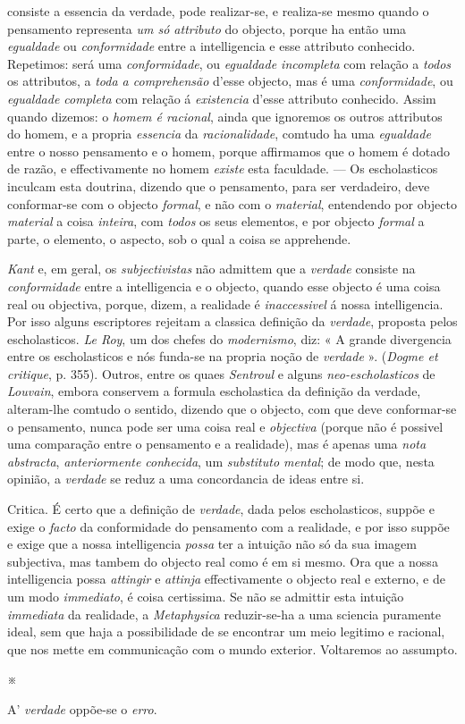 consiste a essencia da verdade, pode realizar-se, e realiza-se mesmo quando o pensamento representa \emph{um só attributo} do objecto, porque ha então uma \emph{egualdade} ou \emph{conformidade} entre a intelligencia e esse attributo conhecido. Repetimos: será uma \emph{conformidade}, ou \emph{egualdade incompleta} com relação a \emph{todos} os attributos, a \emph{toda a comprehensão} d'esse objecto, mas é uma \emph{conformidade}, ou \emph{egualdade completa} com relação á \emph{existencia} d'esse attributo conhecido. Assim quando dizemos: o \emph{homem é racional}, ainda que ignoremos os outros attributos do homem, e a propria \emph{essencia} da \emph{racionalidade}, comtudo ha uma \emph{egualdade} entre o nosso pensamento e o homem, porque affirmamos que o homem é dotado de razão, e effectivamente no homem \emph{existe} esta faculdade. --- Os escholasticos inculcam esta doutrina, dizendo que o pensamento, para ser verdadeiro, deve conformar-se com o objecto \emph{formal}, e não com o \emph{material}, entendendo por objecto \emph{material} a coisa \emph{inteira}, com \emph{todos} os seus elementos, e por objecto \emph{formal} a parte, o elemento, o aspecto, sob o qual a coisa se apprehende.\par \emph{Kant} e, em geral, os \emph{subjectivistas} não admittem que a \emph{verdade} consiste na \emph{conformidade} entre a intelligencia e o objecto, quando esse objecto é uma coisa real ou objectiva, porque, dizem, a realidade é \emph{inaccessivel} á nossa intelligencia. Por isso alguns escriptores rejeitam a classica definição da \emph{verdade}, proposta pelos escholasticos. \emph{Le Roy}, um dos chefes do \emph{modernismo}, diz: « A grande divergencia entre os escholasticos e nós funda-se na propria noção de \emph{verdade} ». (\emph{Dogme et critique}, p. 355). Outros, entre os quaes \emph{Sentroul} e alguns \emph{neo-escholasticos} de \emph{Louvain}, embora conservem a formula escholastica da definição da verdade, alteram-lhe comtudo o sentido, dizendo que o objecto, com que deve conformar-se o pensamento, nunca pode ser uma coisa real e \emph{objectiva} (porque não é possivel uma comparação entre o pensamento e a realidade), mas é apenas uma \emph{nota abstracta}, \emph{anteriormente conhecida}, um \emph{substituto mental}; de modo que, nesta opinião, a \emph{verdade} se reduz a uma concordancia de ideas entre si.\par Critica. É certo que a definição de \emph{verdade}, dada pelos escholasticos, suppõe e exige o \emph{facto} da conformidade do pensamento com a realidade, e por isso suppõe e exige que a nossa intelligencia \emph{possa} ter a intuição não só da sua imagem subjectiva, mas tambem do objecto real como é em si mesmo. Ora que a nossa intelligencia possa \emph{attingir} e \emph{attinja} effectivamente o objecto real e externo, e de um modo \emph{immediato}, é coisa certissima. Se não se admittir esta intuição \emph{immediata} da realidade, a \emph{Metaphysica} reduzir-se-ha a uma sciencia puramente ideal, sem que haja a possibilidade de se encontrar um meio legitimo e racional, que nos mette em communicação com o mundo exterior. Voltaremos ao assumpto.\par ※\par A' \emph{verdade} oppõe-se o \emph{erro}. 